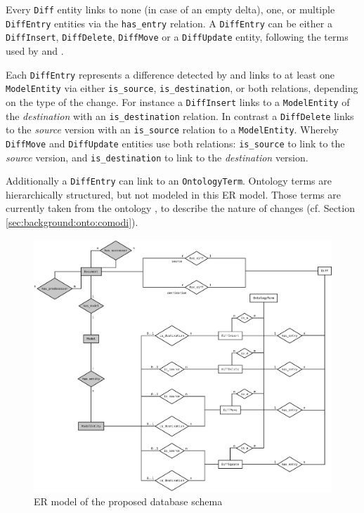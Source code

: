 Every \texttt{Diff} entity links to none  (in case of an empty delta), one, or multiple \texttt{DiffEntry} entities via the \texttt{has\_entry} relation.  
A \texttt{DiffEntry} can be either a \texttt{DiffInsert},  \texttt{DiffDelete}, \texttt{DiffMove} or a \texttt{DiffUpdate} entity, following the terms used by \bives \citep{Scharm2015} and \comodi \citep{Scharm2016}.

Each \texttt{DiffEntry} represents a difference detected by \bives \citep{Scharm2015} and links to at least one \texttt{ModelEntity} via either \texttt{is\_source}, \texttt{is\_destination}, or both relations, depending on the type of the change.
For instance a \texttt{DiffInsert} links to a \texttt{ModelEntity} of the \emph{destination} with an \texttt{is\_destination} relation.
In contrast a \texttt{DiffDelete} links to the \emph{source} version with an \texttt{is\_source} relation to a \texttt{ModelEntity}. Whereby \texttt{DiffMove} and \texttt{DiffUpdate} entities use both relations: \texttt{is\_source} to link to the \emph{source} version, and \texttt{is\_destination} to link to the \emph{destination} version.

Additionally a \texttt{DiffEntry} can link to an \texttt{OntologyTerm}. Ontology terms are hierarchically structured, but not modeled in this ER model. Those terms are currently taken from the \comodi ontology \citep{Scharm2016}, to describe the nature of changes (cf. Section \ref{sec:background:onto:comodi}).



\begin{figure}[h]
	\centering
	\includegraphics[width=\textwidth]{resources/db-concept-er.pdf}
	\caption{ER model of the proposed database schema}
	\label{fig:db-er-model}
\end{figure}

